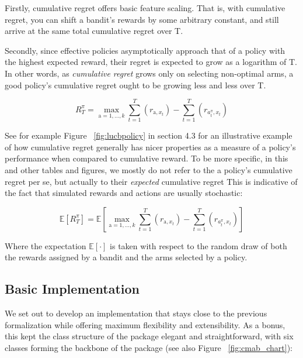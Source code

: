 \documentclass[nojss]{jss}\usepackage[]{graphicx}\usepackage[]{color}
\begin{document}
Firstly, cumulative regret offers basic feature scaling.  That is, with cumulative regret, you can shift a bandit's rewards by some arbitrary constant, and still arrive at the same total cumulative regret over T.

Secondly, since effective policies asymptotically approach that of a policy with the highest expected reward, their regret is expected to grow as a logarithm of T. In other words, as \textit{cumulative regret} grows only on selecting non-optimal arms, a good policy's cumulative regret ought to be growing less and less over T.

\begin{equation} \label{eq:2}
R^{\pi}_{T} = \max_{\mathrm{a} = 1, \dots, k} \sum^{T}_{t=1}(r_{\mathrm{a},x_t}) - \sum^{T}_{t=1}(r_{a^{\pi}_t,x_t})
\end{equation}

See for example Figure ~\ref{fig:lucbpolicy} in section 4.3 for an illustrative example of how cumulative regret generally has nicer properties as a measure of a policy's performance when compared to cumulative reward. To be more specific, in this and other tables and figures, we mostly do not refer to the a policy's cumulative regret per se, but actually to their \textit{expected} cumulative regret This is indicative of the fact that simulated rewards and actions are usually stochastic:

\begin{equation} \label{eq:3}
\mathbb{E}\left[R^{\pi}_{T} \right] = \mathbb{E}\left[  \max_{\mathrm{a} = 1, \dots, k} \sum^{T}_{t=1}(r_{\mathrm{a},x_t}) - \sum^{T}_{t=1}(r_{a^{\pi}_t,x_t})\right]
\end{equation}

Where the expectation $\mathbb{E}\left[ \mathord{\cdot}\right]$ is taken with respect to the random draw of both the rewards assigned by a bandit and the arms selected by a policy.

\subsection{Basic Implementation}

We set out to develop an implementation that stays close to the previous formalization while offering maximum flexibility and extensibility. As a bonus, this kept the class structure of the package elegant and straightforward, with six classes forming the backbone of the package (see also Figure ~\ref{fig:cmab_chart}):
\end{document}

